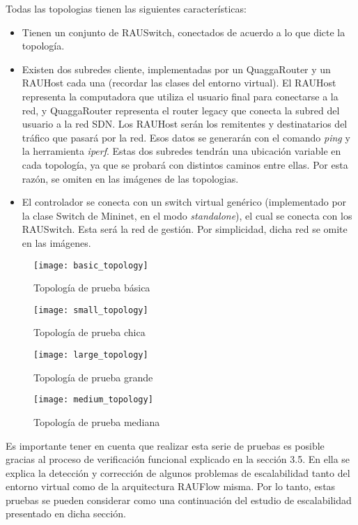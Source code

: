 Todas las topologias tienen las siguientes características:
\begin{itemize}
	\item Tienen un conjunto de RAUSwitch, conectados de acuerdo a lo que dicte la topología.
	\item Existen dos subredes cliente, implementadas por un QuaggaRouter y un RAUHost cada una (recordar las clases del entorno virtual). El RAUHost representa la computadora que utiliza el usuario final para conectarse a la red, y QuaggaRouter representa el router legacy que conecta la subred del usuario a la red SDN. Los RAUHost serán los remitentes y destinatarios del tráfico que pasará por la red. Esos datos se generarán con el comando \textit{ping} y la herramienta \textit{iperf}. Estas dos subredes tendrán una ubicación variable en cada topología, ya que se probará con distintos caminos entre ellas. Por esta razón, se omiten en las imágenes de las topologias.
	\item El controlador se conecta con un switch virtual genérico (implementado por la clase Switch de Mininet, en el modo \textit{standalone}), el cual se conecta con los RAUSwitch. Esta será la red de gestión. Por simplicidad, dicha red se omite en las imágenes.
\end{itemize}

\begin{figure}[H]
	\caption{Topología de prueba básica}
	\texttt{[image: basic\_topology]}
	\centering
	\label{fig:basic_topology}
\end{figure}

\begin{figure}[H]
	\caption{Topología de prueba chica}
	\texttt{[image: small\_topology]}
	\centering
	\label{fig:small_topology}
\end{figure}

\begin{figure}[H]
	\caption{Topología de prueba grande}
	\texttt{[image: large\_topology]}
	\centering
	\label{fig:large_topology}
\end{figure}

\begin{figure}[H]
	\caption{Topología de prueba mediana}
	\texttt{[image: medium\_topology]}
	\centering
	\label{fig:medium_topology}
\end{figure}

Es importante tener en cuenta que realizar esta serie de pruebas es posible gracias al proceso de verificación funcional explicado en la sección 3.5. En ella se explica la detección y corrección de algunos problemas de escalabilidad tanto del entorno virtual como de la arquitectura RAUFlow misma. Por lo tanto, estas pruebas se pueden considerar como una continuación del estudio de escalabilidad presentado en dicha sección.

